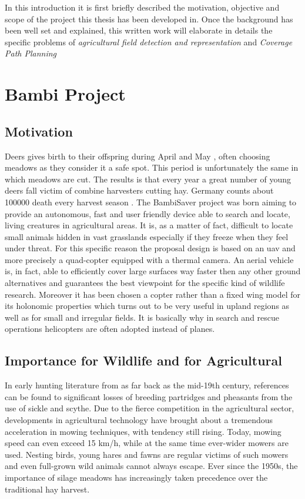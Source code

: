 


In this introduction it is first briefly described the motivation, objective and scope of the project this thesis has been developed in. Once the background has been well set and explained, this written work will elaborate in details the specific problems of \textit{agricultural field detection and representation} and \textit{Coverage Path Planning}
\section{Bambi Project} %
\label{sec:bambi_project}

\subsection{Motivation} %
\label{ssec:motivation}
 Deers gives birth to their offspring during April and May \cite{MowlingMortality}, often choosing meadows as they consider it a safe spot. This period is unfortunately the same in which meadows are cut. The results is that every year a great number of young deers fall victim of combine harvesters cutting hay. Germany counts about 100000 death every harvest season \cite{MowlingMortality}.
 The BambiSaver project was born aiming to provide an autonomous, fast and user friendly device able to search and locate, living creatures in agricultural areas. It is, as a matter of fact, difficult to locate small animals hidden in vast grasslands especially if they freeze when they feel under threat. For this specific reason the proposal design is based on an \acrfull{uav}\cite{ICAO} and more precisely a quad-copter equipped with a thermal camera.
 An aerial vehicle is, in fact, able to efficiently cover large surfaces way faster then any other ground alternatives and guarantees the best viewpoint for the specific kind of wildlife research. Moreover it has been chosen a copter rather than a fixed wing model for its holonomic properties which turns out to be very useful in upland regions as well as for small and irregular fields. It is basically why in search and rescue operations helicopters are often adopted instead of planes.

\subsection{Importance for Wildlife and for Agricultural}
In early hunting literature from as far back as the mid-19th century, references can be found to significant losses of breeding partridges and pheasants from the use of sickle and scythe. Due to the fierce competition in the agricultural sector, developments in agricultural technology have brought about a tremendous acceleration in mowing techniques, with tendency still rising. Today, mowing speed can even exceed 15 km/h, while at the same time ever-wider mowers are used. Nesting birds, young hares and fawns are regular victims of such mowers and even full-grown wild animals cannot always escape. Ever since the 1950s, the importance of silage meadows has increasingly taken precedence over the traditional hay harvest.

